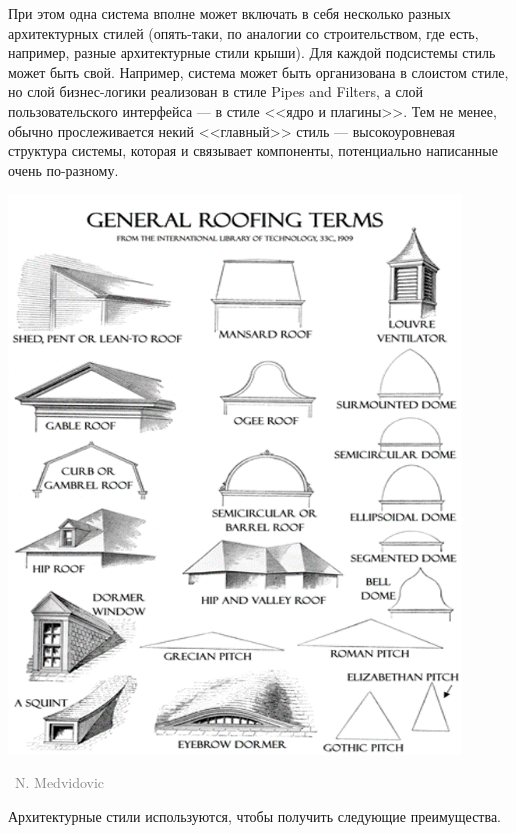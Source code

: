 \documentclass[a5paper]{article}
\newlength\Colsep
\newcommand{\attribution}[1] {
    \vspace{-4mm}\begin{flushright}\begin{scriptsize}\textcolor{gray}
    {\textcopyright\, #1}\end{scriptsize}\end{flushright}
}
\begin{document}
\noindent\begin{minipage}{\textwidth}
    \begin{minipage}[c][6cm][c]{\dimexpr0.6\textwidth-0.5\Colsep\relax}
        При этом одна система вполне может включать в себя несколько разных архитектурных стилей (опять-таки, по аналогии со строительством, где есть, например, разные архитектурные стили крыши). Для каждой подсистемы стиль может быть свой. Например, система может быть организована в слоистом стиле, но слой бизнес-логики реализован в стиле Pipes and Filters, а слой пользовательского интерфейса --- в стиле <<ядро и плагины>>. Тем не менее, обычно прослеживается некий <<главный>> стиль --- высокоуровневая структура системы, которая и связывает компоненты, потенциально написанные очень по-разному.
    \end{minipage}\hfill
    \begin{minipage}[c][6cm][c]{\dimexpr0.4\textwidth-0.5\Colsep\relax}
        \includegraphics[width=0.9\textwidth]{roofStyles.png}
        \attribution{N. Medvidovic}
    \end{minipage}%
\end{minipage}

Архитектурные стили используются, чтобы получить следующие преимущества.
\end{document}
